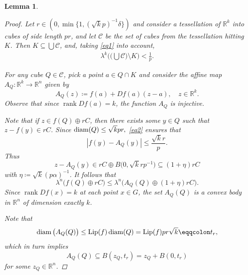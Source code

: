 \documentclass[pdflatex,sn-mathphys-num]{sn-jnl}
\theoremstyle{plain}
\newtheorem{lemma}[theorem]{Lemma}
\theoremstyle{definition}
\DeclareMathOperator{\rank}{rank}
\DeclareMathOperator{\diam}{\textup{diam}}
\begin{document}
\begin{lemma}
\begin{proof}
            Let $r\in(0, \min\{1, (\sqrt{k}p)^{-1}\delta \})$ and consider a tessellation of $\mathbb{R}^k$ into
 cubes of side length $pr$, and let $\mathcal{C}$ be the set of cubes from the tessellation
 hitting $K$. Then $ K\subseteq\bigcup \mathcal{C}$, and, taking \eqref{eq1} into account, \begin{align}\label{Eq4}
     \lambda^k\bigg(\Big(\bigcup\mathcal{C}\Big)\setminus K\bigg)<\frac{1}{p}.
 \end{align}

 For any cube $Q\in\mathcal{C}$, pick a point $a\in Q\cap K$ and consider the affine map $A_Q\colon\mathbb{R}^k\to\mathbb{R}^n$ given by $$A_Q(z)\coloneq f(a)+Df(a)(z-a), \quad\text{$z\in\mathbb{R}^k$.}$$ Observe that since $\rank Df(a)=k$, the function $A_Q$ is injective.

Note that if $z\in f(Q)\oplus rC$, then there exists some $y\in Q$ such that $z-f(y)\in rC$. Since $\diam(Q)\leq\sqrt{k}pr,$ \eqref{eq2} ensures that $$|f(y)-A_Q(y)|\leq\frac{\sqrt{k}r}{p}.$$  Thus \begin{equation}
    z-A_Q(y)\in rC \oplus B\big(0, \sqrt{k}rp^{-1}\big)\subseteq (1+\eta)r C
\end{equation}
with $\eta\coloneq\sqrt{k}(p\alpha)^{-1}$. It follows that \begin{equation}\label{Eq5}
    \lambda^n\big(f(Q)\oplus rC\big)\leq\lambda^n\big(A_Q(Q)\oplus (1+\eta)rC\big).
\end{equation} Since $\rank Df(x)=k$ at each point $x\in G$, the set $A_Q(Q)$ is a convex body in $\mathbb{R}^n$ of dimension exactly $k$.

Note that \begin{equation*}
    \diam\big(A_Q(Q)\big)\leq \textup{Lip}(f)\diam(Q)=\textup{Lip}(f)pr\sqrt{k}\eqqcolon t_r,
\end{equation*} which in turn implies \begin{equation}\label{pp4}
    A_Q(Q)\subseteq B(z_{Q}, t_r)=z_{Q}+B(0, t_r)
\end{equation} for some $z_{Q}\in\mathbb{R}^n$.


\end{proof}
\end{lemma}
\end{document}
